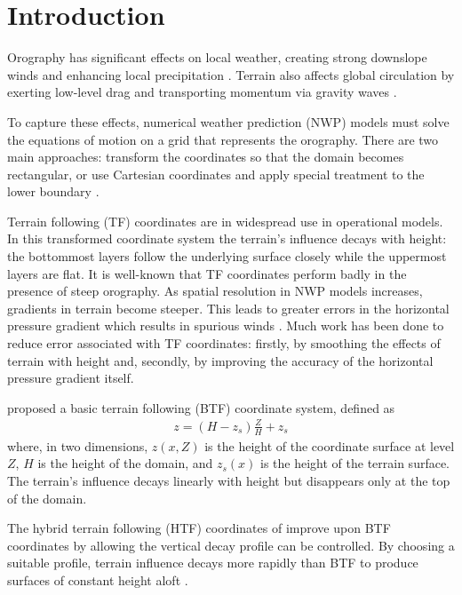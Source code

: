 \chapter{Introduction}

Orography has significant effects on local weather, creating strong downslope winds and enhancing local precipitation \autocite{barry2008}.  Terrain also affects global circulation by exerting low-level drag \autocite{lott-miller1997} and transporting momentum via gravity waves \autocite{mcfarlane1987}.

To capture these effects, numerical weather prediction (NWP) models must solve the equations of motion on a grid that represents the orography.  There are two main approaches: transform the coordinates so that the domain becomes rectangular, or use Cartesian coordinates and apply special treatment to the lower boundary \autocite{galchen-somerville1975}.

Terrain following (TF) coordinates are in widespread use in operational models.  In this transformed coordinate system the terrain's influence decays with height: the bottommost layers follow the underlying surface closely while the uppermost layers are flat.  It is well-known that TF coordinates perform badly in the presence of steep orography.  As spatial resolution in NWP models increases, gradients in terrain become steeper.  This leads to greater errors in the horizontal pressure gradient which results in spurious winds \autocite{dempsey-davis1998}.  Much work has been done to reduce error associated with TF coordinates: firstly, by smoothing the effects of terrain with height and, secondly, by improving the accuracy of the horizontal pressure gradient itself.

\textcite{galchen-somerville1975} proposed a basic terrain following (BTF) coordinate system, defined as
\begin{align}
z = \left( H - z_s \right) \frac{Z}{H} + z_s
\end{align}
where, in two dimensions, $z(x, Z)$ is the height of the coordinate surface at level $Z$, $H$ is the height of the domain, and $z_s(x)$ is the height of the terrain surface.     The terrain's influence decays linearly with height but disappears only at the top of the domain.

The hybrid terrain following (HTF) coordinates of \textcite{simmons-burridge1981} improve upon BTF coordinates by allowing the vertical decay profile can be controlled.  By choosing a suitable profile, terrain influence decays more rapidly than BTF to produce surfaces of constant height aloft \autocite{klemp2011}.

